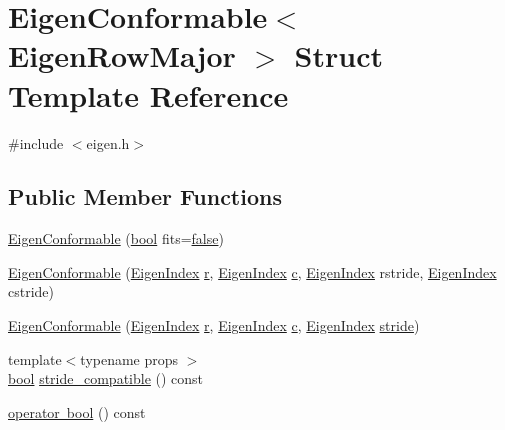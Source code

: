 \hypertarget{struct_eigen_conformable}{}\section{Eigen\+Conformable$<$ Eigen\+Row\+Major $>$ Struct Template Reference}
\label{struct_eigen_conformable}


{\ttfamily \#include $<$eigen.\+h$>$}

\subsection*{Public Member Functions}
\begin{DoxyCompactItemize}
\item 
\mbox{\hyperlink{struct_eigen_conformable_a1061925396248cab26b777a4a5f17fc2}{Eigen\+Conformable}} (\mbox{\hyperlink{asdl_8h_af6a258d8f3ee5206d682d799316314b1}{bool}} fits=\mbox{\hyperlink{asdl_8h_af6a258d8f3ee5206d682d799316314b1ae9de385ef6fe9bf3360d1038396b884c}{false}})
\item 
\mbox{\hyperlink{struct_eigen_conformable_a54b71e05fb8b9dc914cc3c52c8ca9a34}{Eigen\+Conformable}} (\mbox{\hyperlink{eigen_8h_a4e595ab182718d84a409dd05e0829bdd}{Eigen\+Index}} \mbox{\hyperlink{_s_d_l__opengl_8h_a42ce7cdc612e53abee15043f80220d97}{r}}, \mbox{\hyperlink{eigen_8h_a4e595ab182718d84a409dd05e0829bdd}{Eigen\+Index}} \mbox{\hyperlink{_s_d_l__opengl__glext_8h_a1f2d7f8147412c43ba2303a56f97ee73}{c}}, \mbox{\hyperlink{eigen_8h_a4e595ab182718d84a409dd05e0829bdd}{Eigen\+Index}} rstride, \mbox{\hyperlink{eigen_8h_a4e595ab182718d84a409dd05e0829bdd}{Eigen\+Index}} cstride)
\item 
\mbox{\hyperlink{struct_eigen_conformable_a5e9a4c9c561bfc0bc8fba49eb196f242}{Eigen\+Conformable}} (\mbox{\hyperlink{eigen_8h_a4e595ab182718d84a409dd05e0829bdd}{Eigen\+Index}} \mbox{\hyperlink{_s_d_l__opengl_8h_a42ce7cdc612e53abee15043f80220d97}{r}}, \mbox{\hyperlink{eigen_8h_a4e595ab182718d84a409dd05e0829bdd}{Eigen\+Index}} \mbox{\hyperlink{_s_d_l__opengl__glext_8h_a1f2d7f8147412c43ba2303a56f97ee73}{c}}, \mbox{\hyperlink{eigen_8h_a4e595ab182718d84a409dd05e0829bdd}{Eigen\+Index}} \mbox{\hyperlink{_s_d_l__opengl__glext_8h_a743715bb319dd426e85b9774559cc0ea}{stride}})
\item 
{\footnotesize template$<$typename props $>$ }\\\mbox{\hyperlink{asdl_8h_af6a258d8f3ee5206d682d799316314b1}{bool}} \mbox{\hyperlink{struct_eigen_conformable_a8faa27145cf2b8940a7d8919de19f9ad}{stride\+\_\+compatible}} () const
\item 
\mbox{\hyperlink{struct_eigen_conformable_ac7008819fa3fa453095205463c39e2fd}{operator bool}} () const
\end{DoxyCompactItemize}
